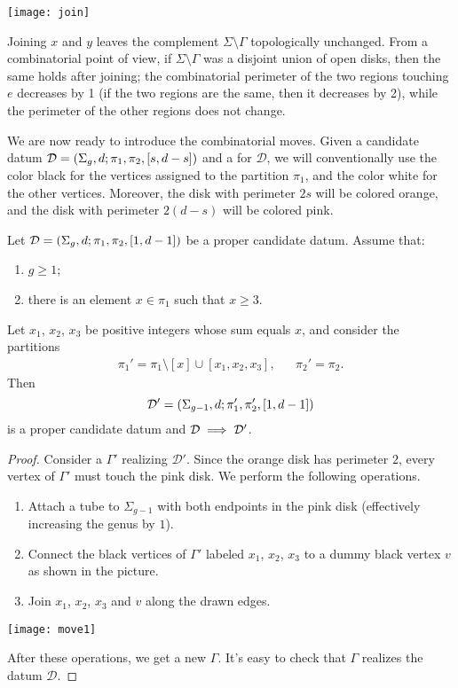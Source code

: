 \documentclass{article}
\begin{document}
\begin{center}
\texttt{[image: join]}
\end{center}

Joining $x$ and $y$ leaves the complement $\Sigma\setminus\Gamma$ topologically unchanged. From a combinatorial point of view, if $\Sigma\setminus\Gamma$ was a disjoint union of open disks, then the same holds after joining; the combinatorial perimeter of the two regions touching $e$ decreases by 1 (if the two regions are the same, then it decreases by 2), while the perimeter of the other regions does not change.

We are now ready to introduce the combinatorial moves. Given a candidate datum $\mathcal{D}=\left(\Sigma_g,d;\pi_1,\pi_2,[s,d-s]\right)$ and a \dessin{} for $\mathcal{D}$, we will conventionally use the color black for the vertices assigned to the partition $\pi_1$, and the color white for the other vertices. Moreover, the disk with perimeter $2s$ will be colored orange, and the disk with perimeter $2(d-s)$ will be colored pink.

\begin{combinatorialmove}\label{move:s1-3}
Let $\mathcal{D}=\left(\Sigma_g,d;\pi_1,\pi_2,[1,d-1]\right)$ be a proper candidate datum. Assume that:
\begin{enumerate}
\item $g\ge 1$;
\item there is an element $x\in\pi_1$ such that $x\ge 3$.
\end{enumerate}
Let $x_1$, $x_2$, $x_3$ be positive integers whose sum equals $x$, and consider the partitions
\begin{align*}
\pi_1'=\pi_1\setminus[x]\cup[x_1,x_2,x_3],&&\pi_2'=\pi_2.
\end{align*}
Then
\[
\mathcal{D'}=\left(\Sigma_{g-1},d;\pi_1',\pi_2',[1,d-1]\right)
\]
is a proper candidate datum and $\mathcal{D}\implies\mathcal{D}'$.
\end{combinatorialmove}
\begin{proof}
Consider a \dessin{} $\Gamma'$ realizing $\mathcal{D}'$. Since the orange disk has perimeter $2$, every vertex of $\Gamma'$ must touch the pink disk. We perform the following operations.
\begin{enumerate}
\item Attach a tube to $\Sigma_{g-1}$ with both endpoints in the pink disk (effectively increasing the genus by $1$).
\item Connect the black vertices of $\Gamma'$ labeled $x_1$, $x_2$, $x_3$ to a dummy black vertex $v$ as shown in the picture.
\item Join $x_1$, $x_2$, $x_3$ and $v$ along the drawn edges.
\end{enumerate}
\begin{center}
\texttt{[image: move1]}
\end{center}
After these operations, we get a new \dessin{} $\Gamma$. It's easy to check that $\Gamma$ realizes the datum $\mathcal{D}$.
\end{proof}
\end{document}
